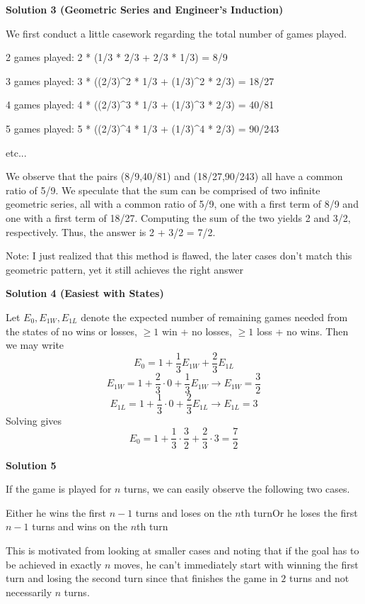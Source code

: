 \begin{enumerate}
 



\textbf{Solution 3 (Geometric Series and Engineer's Induction)}

We first conduct a little casework regarding the total number of games played.

 2 games played: 2 * (1/3 * 2/3 + 2/3 * 1/3) = 8/9

 3 games played: 3 * ((2/3)\textasciicircum{}2 * 1/3 + (1/3)\textasciicircum{}2 * 2/3) = 18/27

 4 games played: 4 * ((2/3)\textasciicircum{}3 * 1/3 + (1/3)\textasciicircum{}3 * 2/3) = 40/81

 5 games played: 5 * ((2/3)\textasciicircum{}4 * 1/3 + (1/3)\textasciicircum{}4 * 2/3) = 90/243

 etc...

 We observe that the pairs (8/9,40/81) and (18/27,90/243) all have a common ratio of 5/9. We speculate that the sum can be comprised of two infinite geometric series, all with a common ratio of 5/9, one with a first term of 8/9 and one with a first term of 18/27. Computing the sum of the two yields 2 and 3/2, respectively. Thus, the answer is 2 + 3/2 = 7/2.

 Note: I just realized that this method is flawed, the later cases don't match this geometric pattern, yet it still achieves the right answer

 



\textbf{Solution 4 (Easiest with States)}

Let $E_0, E_{1W}, E_{1L}$ denote the expected number of remaining games needed from the states of no wins or losses, $\ge 1$ win + no losses, $\ge 1$ loss + no wins. Then we may write
 \[E_0 = 1 + \frac{1}{3} E_{1W} + \frac{2}{3} E_{1L}\]
 \[E_{1W} = 1 + \frac{2}{3} \cdot 0 + \frac{1}{3} E_{1W} \rightarrow E_{1W} = \frac{3}{2}\]
 \[E_{1L} = 1 + \frac{1}{3} \cdot 0 + \frac{2}{3} E_{1L} \rightarrow E_{1L} = 3\]Solving gives 
 \[E_0 = 1 + \frac{1}{3} \cdot \frac{3}{2} + \frac{2}{3} \cdot 3 = \boxed{\frac{7}{2}}\]




\textbf{Solution 5}

If the game is played for $n$ turns, we can easily observe the following two cases.

 Either he wins the first $n - 1$ turns and loses on the $n$th turnOr he loses the first $n - 1$ turns and wins on the $n$th turn

 This is motivated from looking at smaller cases and noting that if the goal has to be achieved in exactly $n$ moves, he can't immediately start with winning the first turn and losing the second turn since that finishes the game in $2$ turns and not necessarily $n$ turns.


\end{enumerate}
